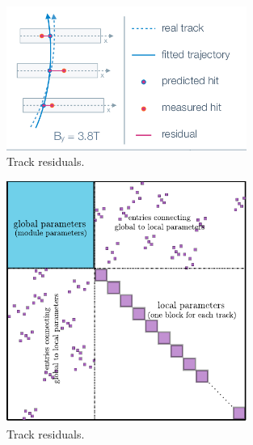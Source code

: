 \begin{figure}[htb]
    \begin{center}
        \includegraphics[width=0.70\textwidth]{../figs/Alignment/track.png}
    \end{center}
    \caption{Track residuals.}
    \label{fig:trackAndResiduals}
\end{figure}

\begin{figure}[htb]
    \begin{center}
        \includegraphics[width=0.70\textwidth]{../figs/Alignment/mpmatrix.pdf}
    \end{center}
    \caption{Track residuals.}
    \label{fig:trackAndResiduals}
\end{figure}
